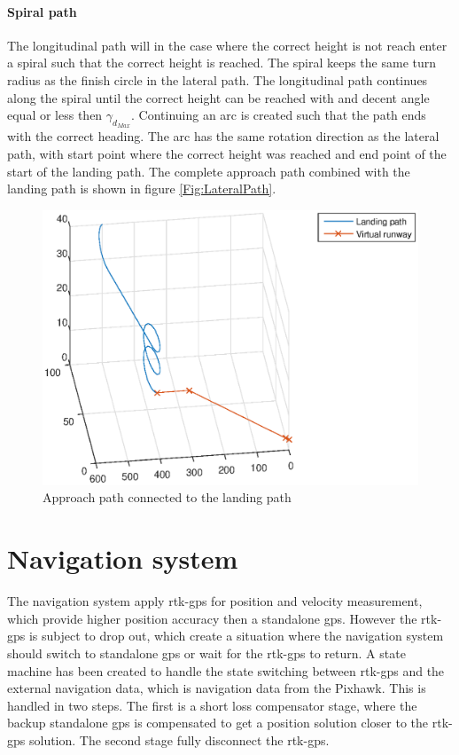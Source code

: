 \paragraph{Spiral path}
The longitudinal path will in the case where the correct height is not reach enter a spiral such that the correct height is reached. The spiral keeps the same turn radius as the finish circle in the lateral path. The longitudinal path continues along the spiral until the correct height can be reached with and decent angle equal or less then $\gamma_{d_{Max}}$. Continuing an arc is created such that the path ends with the correct heading. The arc has the same rotation direction as the lateral path, with start point where the correct height was reached and end point of the start of the landing path. The complete approach path combined with the landing path is shown in figure \ref{Fig:LateralPath}.
\begin{figure}[H]
	\centering
		\includegraphics[width=1\textwidth]{figs/SysPlot/LandingPath.eps}
		\caption{Approach path connected to the landing path}
		\label{Fig:LandingPath}
\end{figure}
\section{Navigation system}
The navigation system apply \gls{rtk-gps} for position and velocity measurement, which provide higher position accuracy then a standalone \gls{gps}. However the \gls{rtk-gps} is subject to drop out, which create a situation where the navigation system should switch to standalone \gls{gps} or wait for the \gls{rtk-gps} to return. A state machine has been created to handle the state switching between \gls{rtk-gps} and the external navigation data, which is navigation data from the Pixhawk. This is handled in two steps. The first is a short loss compensator stage, where the backup standalone \gls{gps} is compensated to get a position solution closer to the \gls{rtk-gps} solution. The second stage fully disconnect the \gls{rtk-gps}.

